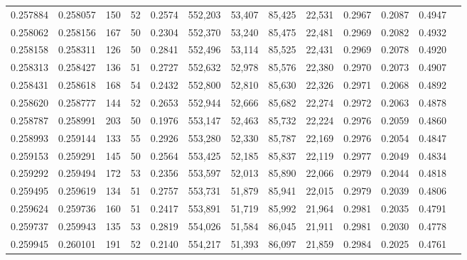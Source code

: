 \begin{tabular}{rrrrrrrrrrrrr}
0.257884 & 0.258057 &   150 &  52 &                                     0.2574 & 552,203 &  53,407 &  85,425 &  22,531 & 0.2967 & 0.2087 & 0.4947 \\
0.258062 & 0.258156 &   167 &  50 &                                     0.2304 & 552,370 &  53,240 &  85,475 &  22,481 & 0.2969 & 0.2082 & 0.4932 \\
0.258158 & 0.258311 &   126 &  50 &                                     0.2841 & 552,496 &  53,114 &  85,525 &  22,431 & 0.2969 & 0.2078 & 0.4920 \\
0.258313 & 0.258427 &   136 &  51 &                                     0.2727 & 552,632 &  52,978 &  85,576 &  22,380 & 0.2970 & 0.2073 & 0.4907 \\
0.258431 & 0.258618 &   168 &  54 &                                     0.2432 & 552,800 &  52,810 &  85,630 &  22,326 & 0.2971 & 0.2068 & 0.4892 \\
0.258620 & 0.258777 &   144 &  52 &                                     0.2653 & 552,944 &  52,666 &  85,682 &  22,274 & 0.2972 & 0.2063 & 0.4878 \\
0.258787 & 0.258991 &   203 &  50 &                                     0.1976 & 553,147 &  52,463 &  85,732 &  22,224 & 0.2976 & 0.2059 & 0.4860 \\
0.258993 & 0.259144 &   133 &  55 &                                     0.2926 & 553,280 &  52,330 &  85,787 &  22,169 & 0.2976 & 0.2054 & 0.4847 \\
0.259153 & 0.259291 &   145 &  50 &                                     0.2564 & 553,425 &  52,185 &  85,837 &  22,119 & 0.2977 & 0.2049 & 0.4834 \\
0.259292 & 0.259494 &   172 &  53 &                                     0.2356 & 553,597 &  52,013 &  85,890 &  22,066 & 0.2979 & 0.2044 & 0.4818 \\
0.259495 & 0.259619 &   134 &  51 &                                     0.2757 & 553,731 &  51,879 &  85,941 &  22,015 & 0.2979 & 0.2039 & 0.4806 \\
0.259624 & 0.259736 &   160 &  51 &                                     0.2417 & 553,891 &  51,719 &  85,992 &  21,964 & 0.2981 & 0.2035 & 0.4791 \\
0.259737 & 0.259943 &   135 &  53 &                                     0.2819 & 554,026 &  51,584 &  86,045 &  21,911 & 0.2981 & 0.2030 & 0.4778 \\
0.259945 & 0.260101 &   191 &  52 &                                     0.2140 & 554,217 &  51,393 &  86,097 &  21,859 & 0.2984 & 0.2025 & 0.4761 \\

\end{tabular}
